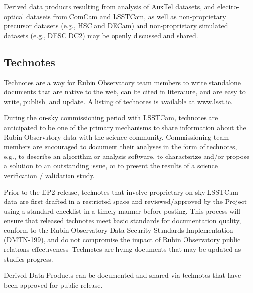 \documentclass[SE,authoryear,toc,lsstdraft]{lsstdoc}
\begin{document}
Derived data products resulting from analysis of AuxTel datasets, and electro-optical datasets from ComCam and LSSTCam, as well as non-proprietary precursor datasets (e.g., HSC and DECam) and non-proprietary simulated datasets (e.g., DESC DC2) may be openly discussed and shared.



\subsection{Technotes}

\href{https://developer.lsst.io/project-docs/technotes.html}{Technotes} are a way for Rubin Observatory team members to write standalone documents that are native to the web, can be cited in literature, and are easy to write, publish, and update.
A listing of technotes is available at \url{www.lsst.io}.

During the on-sky commissioning period with LSSTCam, technotes are anticipated to be one of the primary mechanisms to share information about the Rubin Observatory data with the science community.
Commissioning team members are encouraged to document their analyses in the form of technotes, e.g., to describe an algorithm or analysis software, to characterize and/or propose a solution to an outstanding issue, or to present the results of a science verification / validation study.

Prior to the DP2 release, technotes that involve proprietary on-sky LSSTCam data are first drafted in a restricted space and reviewed/approved by the Project using a standard checklist in a timely manner before posting.
This process will ensure that released technotes meet basic standards for documentation quality, conform to the Rubin Observatory Data Security Standards Implementation (DMTN-199), and do not compromise the impact of Rubin Observatory public relations effectiveness.
Technotes are living documents that may be updated as studies progress.

Derived Data Products can be documented and shared via technotes that have been approved for public release.
\end{document}
